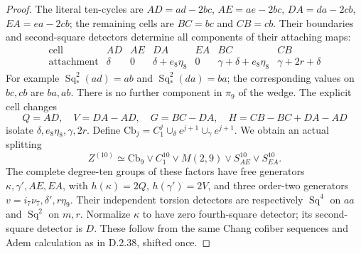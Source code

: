 \begin{proof}
The literal ten-cycles are
$AD=ad-2bc$, $AE=ae-2bc$, $DA=da-2cb$, $EA=ea-2cb$;
the remaining cells are $BC=bc$ and $CB=cb$.
Their boundaries and second-square detectors determine all
components of their attaching maps:
\[
\begin{array}{c|rrrrrr}
\text{cell}&AD&AE&DA&EA&BC&CB\\ \hline
\text{attachment}&\delta&0&\delta+e_8\eta_8&0&
 \gamma+\delta+e_8\eta_8&\gamma+2r+\delta
\end{array}
\tag{D.2.60i}
\]
For example $\operatorname{Sq}_*^2(ad)=ab$ and
$\operatorname{Sq}_*^2(da)=ba$; the corresponding values on
$bc,cb$ are $ba,ab$.  There is no further component in
$\pi_9$ of the wedge.  The explicit cell changes
\[
 Q=AD,\quad V=DA-AD,\quad G=BC-DA,\quad
 H=CB-BC+DA-AD
\]
isolate $\delta,e_8\eta_8,\gamma,2r$.  Define
$\mathrm{Cb}_j=C_1^j\cup_\delta e^{j+1}\cup_\gamma e^{j+1}$.
We obtain an actual splitting
\[
 Z^{(10)}\simeq\mathrm{Cb}_9\vee C_1^{10}\vee M(2,9)
                         \vee S^{10}_{AE}\vee S^{10}_{EA}.
 \tag{D.2.60j}
\]
The complete degree-ten groups of these factors have free
generators $\kappa,\gamma',AE,EA$, with
$h(\kappa)=2Q$, $h(\gamma')=2V$, and three order-two
generators $v=i_7\nu_7,\delta',r\eta_9$.
Their independent torsion detectors are respectively
$\operatorname{Sq}^4$ on $aa$ and $\operatorname{Sq}^2$
on $m,r$.  Normalize $\kappa$ to have zero fourth-square
detector; its second-square detector is $D$.
These follow from the same Chang cofiber sequences and
Adem calculation as in D.2.38, shifted once.


\end{proof}
